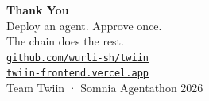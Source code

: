 \documentclass[aspectratio=169,11pt]{beamer}
\begin{document}
{
\begin{frame}[plain]
    \begin{center}
        \vspace{1.1cm}
        {\fontsize{28}{32}\selectfont\bfseries\color{accent} Thank You}\\[0.75cm]
        {\Large\color{ghost} Deploy an agent. Approve once.\\
        The chain does the rest.}\\[1.1cm]
        {\normalsize\color{accent}
            \href{https://github.com/wurli-sh/twiin}{\texttt{github.com/wurli-sh/twiin}}\\[0.25cm]
            \href{https://twiin-frontend.vercel.app/}{\texttt{twiin-frontend.vercel.app}}\\[0.35cm]
            {\color{ghost!80}Team Twiin · Somnia Agentathon 2026}%
        }
    \end{center}
\end{frame}
}
\end{document}
